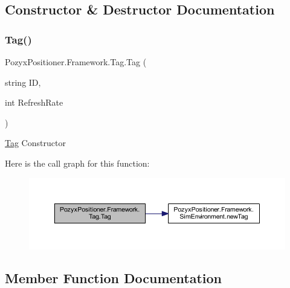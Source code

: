 \subsection{Constructor \& Destructor Documentation}
\mbox{\label{class_pozyx_positioner_1_1_framework_1_1_tag_a9b58a1a5756bf3c8cda1e2afd32276b2}} 
\subsubsection{\texorpdfstring{Tag()}{Tag()}}
{\footnotesize\ttfamily Pozyx\+Positioner.\+Framework.\+Tag.\+Tag (\begin{DoxyParamCaption}\item[{string}]{ID,  }\item[{int}]{Refresh\+Rate }\end{DoxyParamCaption})}



\hyperlink{class_pozyx_positioner_1_1_framework_1_1_tag}{Tag} Constructor 

Here is the call graph for this function\+:\nopagebreak
\begin{figure}[H]
\begin{center}
\leavevmode
\includegraphics[width=350pt]{class_pozyx_positioner_1_1_framework_1_1_tag_a9b58a1a5756bf3c8cda1e2afd32276b2_cgraph}
\end{center}
\end{figure}


\subsection{Member Function Documentation}
\mbox{\label{class_pozyx_positioner_1_1_framework_1_1_tag_ac2741e137c420ad71f64ee2d3d5fefe8}} 
